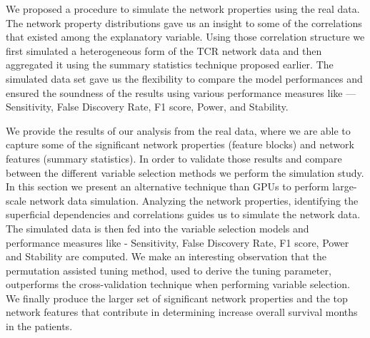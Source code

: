 We proposed a procedure to simulate the network properties using the real data. The network property distributions gave us an insight to some of the correlations that existed among the explanatory variable. Using those correlation structure we first simulated a heterogeneous form of the TCR network data and then aggregated it using the summary statistics technique proposed earlier. The simulated data set gave us the flexibility to compare the model performances and ensured the soundness of the results using various performance measures like --- Sensitivity, False Discovery Rate, F1 score, Power, and Stability.\par

We provide the results of our analysis from the real data, where we are able to capture some of the significant network properties (feature blocks) and network features (summary statistics). In order to validate those results and compare between the different variable selection methods we perform the simulation study. In this section we present an alternative technique than GPUs to perform large-scale network data simulation. Analyzing the network properties, identifying the superficial dependencies and correlations guides us to simulate the network data. The simulated data is then fed into the variable selection models and performance measures like - Sensitivity, False Discovery Rate, F1 score, Power and Stability are computed. We make an interesting observation that the permutation assisted tuning method, used to derive the tuning parameter, outperforms the cross-validation technique when performing variable selection. We finally produce the larger set of significant network properties and the top network features that contribute in determining increase overall survival months in the patients.\par

